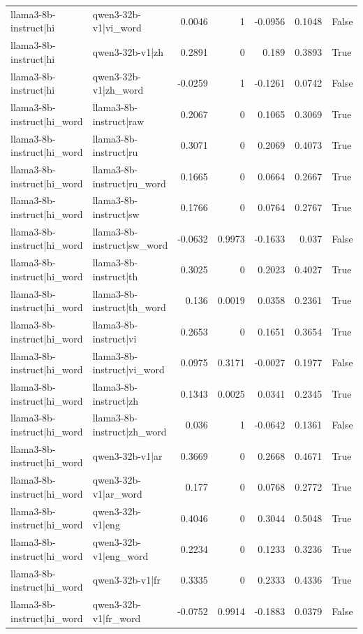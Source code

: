 \begin{table}
\begin{tabular}{l l r r r r l}
llama3-8b-instruct|hi & qwen3-32b-v1|vi_word & 0.0046 & 1 & -0.0956 & 0.1048 & False \\
llama3-8b-instruct|hi & qwen3-32b-v1|zh & 0.2891 & 0 & 0.189 & 0.3893 & True \\
llama3-8b-instruct|hi & qwen3-32b-v1|zh_word & -0.0259 & 1 & -0.1261 & 0.0742 & False \\
llama3-8b-instruct|hi_word & llama3-8b-instruct|raw & 0.2067 & 0 & 0.1065 & 0.3069 & True \\
llama3-8b-instruct|hi_word & llama3-8b-instruct|ru & 0.3071 & 0 & 0.2069 & 0.4073 & True \\
llama3-8b-instruct|hi_word & llama3-8b-instruct|ru_word & 0.1665 & 0 & 0.0664 & 0.2667 & True \\
llama3-8b-instruct|hi_word & llama3-8b-instruct|sw & 0.1766 & 0 & 0.0764 & 0.2767 & True \\
llama3-8b-instruct|hi_word & llama3-8b-instruct|sw_word & -0.0632 & 0.9973 & -0.1633 & 0.037 & False \\
llama3-8b-instruct|hi_word & llama3-8b-instruct|th & 0.3025 & 0 & 0.2023 & 0.4027 & True \\
llama3-8b-instruct|hi_word & llama3-8b-instruct|th_word & 0.136 & 0.0019 & 0.0358 & 0.2361 & True \\
llama3-8b-instruct|hi_word & llama3-8b-instruct|vi & 0.2653 & 0 & 0.1651 & 0.3654 & True \\
llama3-8b-instruct|hi_word & llama3-8b-instruct|vi_word & 0.0975 & 0.3171 & -0.0027 & 0.1977 & False \\
llama3-8b-instruct|hi_word & llama3-8b-instruct|zh & 0.1343 & 0.0025 & 0.0341 & 0.2345 & True \\
llama3-8b-instruct|hi_word & llama3-8b-instruct|zh_word & 0.036 & 1 & -0.0642 & 0.1361 & False \\
llama3-8b-instruct|hi_word & qwen3-32b-v1|ar & 0.3669 & 0 & 0.2668 & 0.4671 & True \\
llama3-8b-instruct|hi_word & qwen3-32b-v1|ar_word & 0.177 & 0 & 0.0768 & 0.2772 & True \\
llama3-8b-instruct|hi_word & qwen3-32b-v1|eng & 0.4046 & 0 & 0.3044 & 0.5048 & True \\
llama3-8b-instruct|hi_word & qwen3-32b-v1|eng_word & 0.2234 & 0 & 0.1233 & 0.3236 & True \\
llama3-8b-instruct|hi_word & qwen3-32b-v1|fr & 0.3335 & 0 & 0.2333 & 0.4336 & True \\
llama3-8b-instruct|hi_word & qwen3-32b-v1|fr_word & -0.0752 & 0.9914 & -0.1883 & 0.0379 & False \\

\end{tabular}
\end{table}

